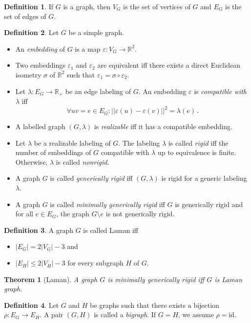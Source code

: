 \documentclass[a4paper, 11pt]{article}
\newcommand{\RR}{\mathbb{R}}
\newtheorem{thm}{Theorem}[section]
\theoremstyle{definition}
\newtheorem{defn}{Definition}[section]
\begin{document}
\begin{defn}
If $G$ is a graph, then $V_G$ is the set of vertices of $G$ and $E_G$ is the set of edges of $G$.
\end{defn}

\begin{defn}
Let $G$ be a simple graph.
\begin{itemize}
	\item An \emph{embedding} of $G$ is a map $\varepsilon:V_G\rightarrow \RR^2$. 
	\item Two embeddings $\varepsilon_1$ and $\varepsilon_2$ are equivalent iff there exists a direct Euclidean isometry $\sigma$ of $\RR^2$ such that $\varepsilon_1=\sigma \circ\varepsilon_2$.
	\item  Let $\lambda:E_G\rightarrow \RR_+$ be an edge labeling of $G$. An embedding $\varepsilon$ is \emph{compatible with} $\lambda$ iff  $$\forall uv=e\in E_G \colon ||\varepsilon(u)-\varepsilon(v)||^2=\lambda(e)\,.$$
	\item A labelled graph $(G,\lambda)$ is \emph{realizable} iff it has a compatible embedding.
	\item Let $\lambda$ be a realizable labeling of $G$. The labeling $\lambda$ is called \emph{rigid} iff the number of embeddings of $G$ compatible with $\lambda$ up to equivalence is finite. Otherwise,  $\lambda$ is called \emph{nonrigid}.
 	\item A graph $G$ is called \emph{generically rigid} iff $(G,\lambda)$ is rigid for a generic labeling $\lambda$.
 	\item A graph $G$ is called \emph{minimally generically rigid} iff $G$ is generically rigid and for all $e\in E_G$, the graph $G\setminus e$ is not generically rigid.
\end{itemize} 
\end{defn}

\begin{defn}
A graph $G$ is called Laman iff
\begin{itemize}
	\item $|E_G|=2|V_G|-3$ and
	\item $|E_H|\leq 2|V_H|-3$ for every subgraph $H$ of $G$. 
\end{itemize}  
\end{defn}

\begin{thm}[Laman]
A graph $G$ is minimally generically rigid iff $G$ is \emph{Laman graph}.
\end{thm}


\begin{defn}
Let $G$ and $H$ be graphs such that there exists a bijection $\rho: E_G \rightarrow E_H$. A pair $(G,H)$ is called a \emph{bigraph}. If $G=H$, we assume $\rho=\text{id}$.
\end{defn}
\end{document}
